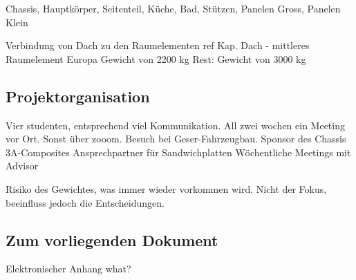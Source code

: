 Chassis, Hauptkörper, Seitenteil, Küche, Bad, Stützen, Panelen Gross, Panelen Klein

Verbindung von Dach zu den Raumelementen ref Kap. Dach - mittleres Raumelement
Europa Gewicht von 2200 kg
Rest: Gewicht von  3000 kg

\subsection{Projektorganisation}
Vier studenten, entsprechend viel Kommunikation.
All zwei wochen ein Meeting vor Ort.
Sonst über zooom.
Besuch bei Geser-Fahrzeugbau.
Sponsor des Chassis
3A-Composites Ansprechpartner für Sandwichplatten
Wöchentliche Meetings mit Advisor

Risiko des Gewichtes, was immer wieder vorkommen wird. Nicht der Fokus, beeinfluss jedoch die Entscheidungen.


\subsection{Zum vorliegenden Dokument}
Elektronischer Anhang
what?

\newpage
